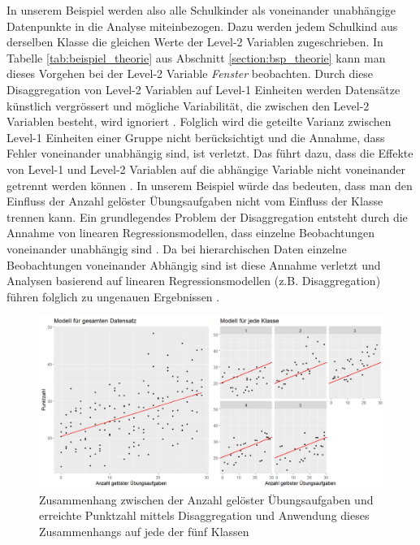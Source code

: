 \documentclass[12pt]{article}\usepackage[]{graphicx}\usepackage[]{color}
\begin{document}
In unserem Beispiel werden also alle Schulkinder als voneinander unabhängige Datenpunkte in die Analyse miteinbezogen. Dazu werden jedem Schulkind aus derselben Klasse die gleichen Werte der Level-2 Variablen zugeschrieben. In Tabelle \ref{tab:beispiel_theorie} aus Abschnitt \ref{section:bsp_theorie} kann man dieses Vorgehen bei der Level-2 Variable \textit{Fenster} beobachten. Durch diese Disaggregation von Level-2 Variablen auf Level-1 Einheiten werden Datensätze künstlich vergrössert und mögliche Variabilität, die zwischen den Level-2 Variablen besteht, wird ignoriert \citep{SnijdersTomA.B2012Ma:a, woltman2012introduction}. Folglich wird die geteilte Varianz zwischen Level-1 Einheiten einer Gruppe nicht berücksichtigt und die Annahme, dass Fehler voneinander unabhängig sind, ist verletzt. Das führt dazu, dass die Effekte von Level-1 und Level-2 Variablen auf die abhängige Variable nicht voneinander getrennt werden können \citep{woltman2012introduction}. In unserem Beispiel würde das bedeuten, dass man den Einfluss der Anzahl gelöster Übungsaufgaben nicht vom Einfluss der Klasse trennen kann. Ein grundlegendes Problem der Disaggregation entsteht durch die Annahme von linearen Regressionsmodellen, dass einzelne Beobachtungen voneinander unabhängig sind \citep{woltman2012introduction}. Da bei hierarchischen Daten einzelne Beobachtungen voneinander Abhängig sind ist diese Annahme verletzt und Analysen basierend auf linearen Regressionsmodellen (z.B. Disaggregation) führen folglich zu ungenauen Ergebnissen \citep{andrew_data, SnijdersTomA.B2012Ma:a, woltman2012introduction}.

\begin{figure}[t!]
\centering
\includegraphics[width = \textwidth]{disaggregation_combined}
\caption{Zusammenhang zwischen der Anzahl gelöster Übungsaufgaben und erreichte Punktzahl mittels Disaggregation und Anwendung dieses Zusammenhangs auf jede der fünf Klassen}
\label{fig:disaggregation}
\end{figure}
\end{document}
